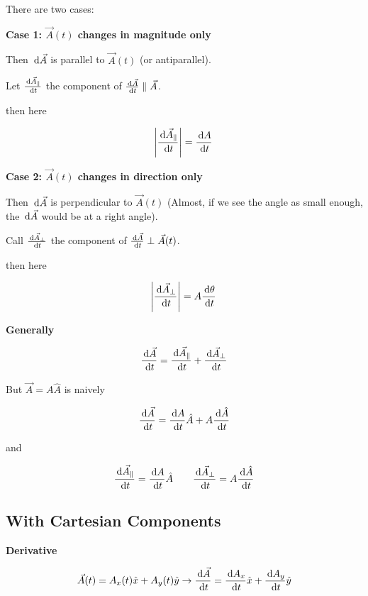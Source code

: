 There are two cases:

\textbf{Case 1: $\vec A(t)$ changes in magnitude only}

Then $\D \vec A$ is parallel to $\vec A(t)$ (or antiparallel).

Let $\frac{\D \vec A_\parallel}{\D t}$ the component of $\frac{\D \vec A}{\D t} \parallel \vec A$.

then here

\begin{equation}
	\abs{\frac{\D \vec A_\parallel}{\D t}} = \frac{\D A}{\D t}
\end{equation}

\textbf{Case 2: $\vec A(t)$ changes in direction only}

Then $\D \vec A$ is perpendicular to $\vec A(t)$ (Almost, if we see the angle as small enough, the $\D \vec A$ would be at a right angle).

Call $\frac{\D \vec A_\perp}{\D t}$ the component of $\frac{\D \vec A}{\D t} \perp \vec A(t)$.

then here

\begin{equation}
	\abs{\frac{\D \vec A_\perp}{\D t}} = A \frac{\D \theta}{\D t}
\end{equation}

\textbf{Generally}

\begin{equation}
	\frac{\D \vec A}{\D t} = \frac{\D \vec A_\parallel}{\D t} + \frac{\D \vec A_\perp}{\D t}
\end{equation}

But $\vec A = A \hat A$ is naively

\begin{equation}
	\frac{\D \vec A}{\D t} = \frac{\D A}{\D t} \hat A + A \frac{\D \hat A}{\D t}
\end{equation}

and

\begin{equation}
	\frac{\D \vec A_\parallel}{\D t} = \frac{\D A}{\D t} \hat A \qquad \frac{\D \vec A_\perp}{\D t} = A \frac{\D \hat A}{\D t}
\end{equation}

\subsection{With Cartesian Components}

\textbf{Derivative}

\begin{equation}
	\vec A(t) = A_x(t) \hat x + A_y(t) \hat y \to \frac{\D \vec A}{\D t} = \frac{\D A_x}{\D t} \hat x + \frac{\D A_y}{\D t} \hat y
\end{equation}

